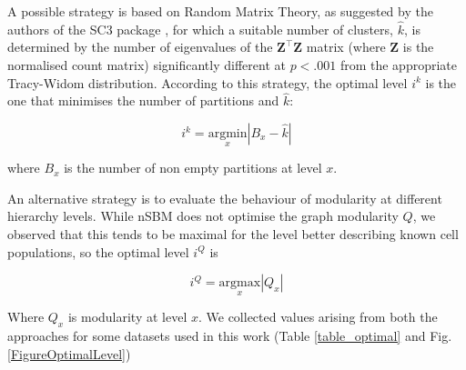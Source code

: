 \documentclass[10pt]{article}
\begin{document}
A possible strategy is based on Random Matrix Theory, as suggested by the authors of the SC3 package  \cite{kiselev_2017}, for which a suitable number of clusters, $\hat{k}$, is determined by the number of eigenvalues of the $\boldsymbol Z^\top\boldsymbol Z$ matrix (where $\boldsymbol Z$ is the normalised count matrix) significantly different at $p<.001$ from the appropriate Tracy-Widom distribution. According to this strategy, the optimal level $i^k$ is the one that minimises the number of partitions and $\hat{k}$:

\begin{equation}
i^k = \underset{x}{\mathrm{argmin}} |B_x - \hat{k}|
\label{Equation_RMT}
\end{equation}

where $B_x$ is the number of non empty partitions at level $x$.

An alternative strategy is to evaluate the behaviour of modularity at different hierarchy levels. While nSBM does not optimise the graph modularity $Q$, we observed that this tends to be maximal for the level better describing known cell populations, so the optimal level $i^Q$ is

\begin{equation}
i^Q = \underset{x}{\mathrm{argmax}} |Q_x|
\label{Equation_MODmax}
\end{equation}

Where $Q_x$ is modularity at level $x$. We collected values arising from both the approaches for some datasets used in this work (Table \ref{table_optimal} and Fig. \ref{FigureOptimalLevel})
\end{document}
